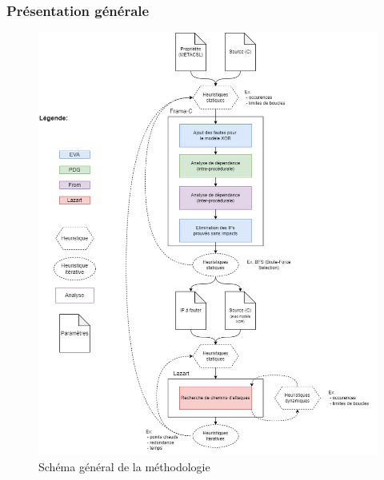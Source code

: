             \subsubsection{Présentation générale}
            \label{sec:lazart:metho:arch}
            
                \begin{figure}[!htp]\centering
                    \includegraphics[scale=0.41]{ch3-lazart/img/fdep.drawio.png}
                    \caption{Schéma général de la méthodologie \cite{lacombe2023combining}} \label{fig:metho-fdep}
                \end{figure}
        

